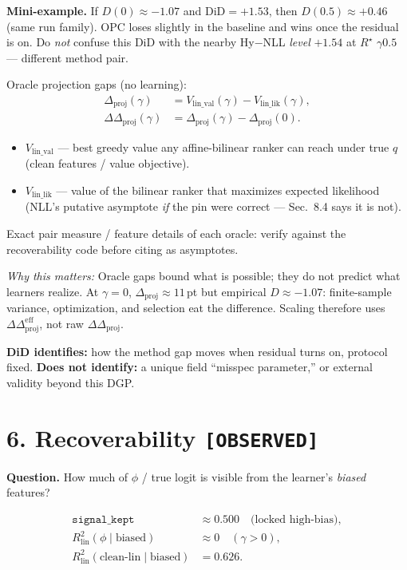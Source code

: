 \documentclass[11pt]{article}
\newcommand{\phonesection}[1]{\Needspace{8\baselineskip}\section*{#1}}
\newcommand{\stag}[1]{\texttt{[#1]}}
\newcommand{\Rstar}{R^{\star}}
\newcommand{\Dproj}{\Delta_{\mathrm{proj}}}
\newcommand{\DDproj}{\Delta\Delta_{\mathrm{proj}}}
\newcommand{\DDprojeff}{\Delta\Delta_{\mathrm{proj}}^{\mathrm{eff}}}
\newcommand{\why}[1]{\par{\footnotesize\color{blue!35!black}\textit{Why this matters:} #1\par}}
\newcommand{\miniex}[1]{\par{\footnotesize\color{black!70}\textbf{Mini-example.} #1\par}}
\begin{document}
\miniex{If $D(0)\approx -1.07$ and
$\mathrm{DiD}=+1.53$, then
$D(0.5)\approx +0.46$ (same run family).
OPC loses slightly in the baseline and wins
once the residual is on.  Do \emph{not}
confuse this DiD with the nearby Hy$-$NLL
\emph{level} $+1.54$ at $\Rstar$ $\gamma0.5$
--- different method pair.}

Oracle projection gaps (no learning):
\begin{align*}
\Dproj(\gamma)
  &= V_{\mathrm{lin\_val}}(\gamma)
   - V_{\mathrm{lin\_lik}}(\gamma),\\
\DDproj(\gamma)
  &= \Dproj(\gamma)-\Dproj(0).
\end{align*}

\begin{itemize}
  \item $V_{\mathrm{lin\_val}}$ --- best
        greedy value any affine-bilinear
        ranker can reach under true $q$
        (clean features / value objective).
  \item $V_{\mathrm{lin\_lik}}$ --- value of
        the bilinear ranker that maximizes
        expected likelihood (NLL's putative
        asymptote \emph{if} the pin were
        correct --- Sec.~8.4 says it is not).
\end{itemize}
Exact pair measure / feature details of each
oracle: verify against the recoverability
code before citing as asymptotes.

\why{Oracle gaps bound what is possible;
they do not predict what learners realize.
At $\gamma{=}0$, $\Dproj\approx 11$\,pt but
empirical $D\approx -1.07$: finite-sample
variance, optimization, and selection eat
the difference.  Scaling therefore uses
$\DDprojeff$, not raw $\DDproj$.}

\textbf{DiD identifies:} how the method gap
moves when residual turns on, protocol fixed.
\textbf{Does not identify:} a unique field
``misspec parameter,'' or external validity
beyond this DGP.

\phonesection{6. Recoverability \stag{OBSERVED}}

\textbf{Question.} How much of $\phi$ / true
logit is visible from the learner's
\emph{biased} features?

\begin{align*}
\texttt{signal\_kept}
  &\approx 0.500
  \quad\text{(locked high-bias)},\\
R^{2}_{\mathrm{lin}}(\phi\mid\mathrm{biased})
  &\approx 0
  \quad(\gamma{>}0),\\
R^{2}_{\mathrm{lin}}(\mathrm{clean\text{-}lin}\mid\mathrm{biased})
  &= 0.626.
\end{align*}
\end{document}
